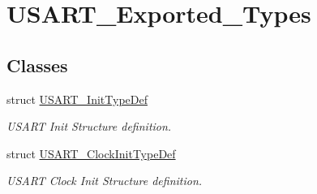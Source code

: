 \hypertarget{group__USART__Exported__Types}{
\section{USART\_\-Exported\_\-Types}
\label{group__USART__Exported__Types}
}
\subsection*{Classes}
\begin{DoxyCompactItemize}
\item 
struct \hyperlink{structUSART__InitTypeDef}{USART\_\-InitTypeDef}
\begin{DoxyCompactList}\small\item\em USART Init Structure definition. \item\end{DoxyCompactList}\item 
struct \hyperlink{structUSART__ClockInitTypeDef}{USART\_\-ClockInitTypeDef}
\begin{DoxyCompactList}\small\item\em USART Clock Init Structure definition. \item\end{DoxyCompactList}\end{DoxyCompactItemize}
